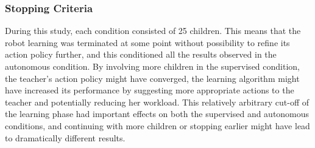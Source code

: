 

\subsubsection{Stopping Criteria}

During this study, each condition consisted of 25 children. This means that the robot learning was terminated at some point without possibility to refine its action policy further, and this conditioned all the results observed in the autonomous condition. By involving more children in the supervised condition, the teacher's action policy might have converged, the learning algorithm might have increased its performance by suggesting more appropriate actions to the teacher and potentially reducing her workload. This relatively arbitrary cut-off of the learning phase had important effects on both the supervised and autonomous conditions, and continuing with more children or stopping earlier might have lead to dramatically different results.

